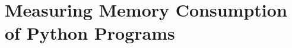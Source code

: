 \chapter{Measuring Memory Consumption of Python Programs}
\label{ch:measuring-memory-consumption}
%
%
%
%
%
%
%

